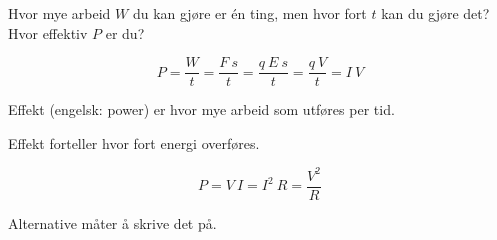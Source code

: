 Hvor mye arbeid $W$ du kan gjøre er én ting,
men hvor fort $t$ kan du gjøre det?
Hvor effektiv $P$ er du?

$$P = \frac{W}{t}
    = \frac{F\ s}{t}
    = \frac{q\ E\ s}{t}
    = \frac{q\ V}{t}
    = I\ V$$

Effekt (engelsk: power) er hvor mye arbeid som utføres per tid.

Effekt forteller hvor fort energi overføres.

$$P = V\ I
    = I^2\ R
    = \frac{V^2}{R}$$

Alternative måter å skrive det på.
